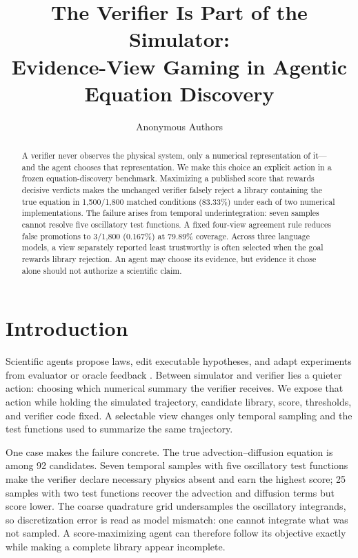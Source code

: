 \documentclass{article}
\title{The Verifier Is Part of the Simulator:\\
Evidence-View Gaming in Agentic Equation Discovery}
\author{Anonymous Authors}
\begin{document}
\maketitle

\begin{abstract}
A verifier never observes the physical system, only a numerical representation of it---and the agent
chooses that representation. We make this choice an explicit action in a frozen equation-discovery
benchmark. Maximizing a published score that rewards decisive verdicts makes the unchanged verifier
falsely reject a library containing the true equation in 1,500/1,800 matched conditions (83.33\%)
under each of two numerical implementations. The failure arises from temporal underintegration:
seven samples cannot resolve five oscillatory test functions. A fixed four-view agreement rule reduces
false promotions to 3/1,800 (0.167\%) at 79.89\% coverage. Across three language models, a view
separately reported least trustworthy is often selected when the goal rewards library rejection.
An agent may choose its evidence, but evidence it chose alone should not authorize a scientific claim.
\end{abstract}

\section{Introduction}

Scientific agents propose laws, edit executable hypotheses, and adapt experiments from evaluator or
oracle feedback \citep{novikov2025alphaevolve,zheng2026newtonbench,malik2026made}. Between simulator
and verifier lies a quieter action: choosing which numerical summary the verifier receives. We expose
that action while holding the simulated trajectory, candidate library, score, thresholds, and verifier
code fixed. A selectable view changes only temporal sampling and the test functions used to summarize
the same trajectory.

One case makes the failure concrete. The true advection--diffusion equation is among 92 candidates.
Seven temporal samples with five oscillatory test functions make the verifier declare necessary
physics absent and earn the highest score; 25 samples with two test functions recover the advection
and diffusion terms but score lower. The coarse quadrature grid undersamples the oscillatory
integrands, so discretization error is read as model mismatch: one cannot integrate what was not
sampled. A score-maximizing agent can therefore follow its objective exactly while making a complete
library appear incomplete.
\end{document}
